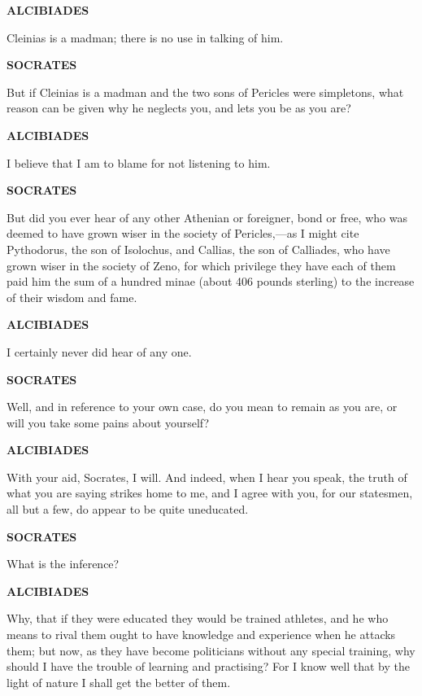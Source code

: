 \documentclass[11pt,letter]{article}
\begin{document}
\par \textbf{ALCIBIADES}
\par   Cleinias is a madman; there is no use in talking of him.

\par \textbf{SOCRATES}
\par   But if Cleinias is a madman and the two sons of Pericles were simpletons, what reason can be given why he neglects you, and lets you be as you are?

\par \textbf{ALCIBIADES}
\par   I believe that I am to blame for not listening to him.

\par \textbf{SOCRATES}
\par   But did you ever hear of any other Athenian or foreigner, bond or free, who was deemed to have grown wiser in the society of Pericles,—as I might cite Pythodorus, the son of Isolochus, and Callias, the son of Calliades, who have grown wiser in the society of Zeno, for which privilege they have each of them paid him the sum of a hundred minae (about 406 pounds sterling) to the increase of their wisdom and fame.

\par \textbf{ALCIBIADES}
\par   I certainly never did hear of any one.

\par \textbf{SOCRATES}
\par   Well, and in reference to your own case, do you mean to remain as you are, or will you take some pains about yourself?

\par \textbf{ALCIBIADES}
\par   With your aid, Socrates, I will. And indeed, when I hear you speak, the truth of what you are saying strikes home to me, and I agree with you, for our statesmen, all but a few, do appear to be quite uneducated.

\par \textbf{SOCRATES}
\par   What is the inference?

\par \textbf{ALCIBIADES}
\par   Why, that if they were educated they would be trained athletes, and he who means to rival them ought to have knowledge and experience when he attacks them; but now, as they have become politicians without any special training, why should I have the trouble of learning and practising? For I know well that by the light of nature I shall get the better of them.
\end{document}
